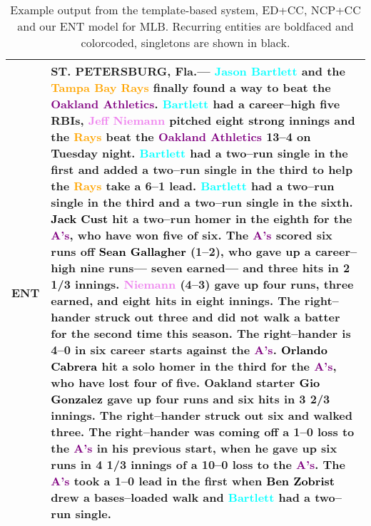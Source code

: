 \documentclass[11pt,a4paper]{article}
\begin{document}
\begin{table*}
\begin{tabular}{|c|p{13.5cm}|}
\\ 
\hline 
ENT & 
ST. PETERSBURG, Fla.--- \textcolor{cyan}{\textbf{Jason Bartlett}} and the \textcolor{orange}{\textbf{Tampa Bay Rays}} finally found a way to beat the \textcolor{purple}{\textbf{Oakland Athletics}}. \textcolor{cyan}{\textbf{Bartlett}} had a career--high five RBIs, \textcolor{violet}{\textbf{Jeff Niemann}} pitched eight strong innings and the \textcolor{orange}{\textbf{Rays}} beat the \textcolor{purple}{\textbf{Oakland Athletics}} 13--4 on Tuesday night. \textcolor{cyan}{\textbf{Bartlett}} had a two--run single in the first and added a two--run single in the third to help the \textcolor{orange}{\textbf{Rays}} take a 6--1 lead. \textcolor{cyan}{\textbf{Bartlett}} had a two--run single in the third and a two--run single in the sixth. \textcolor{black}{\textbf{Jack Cust}} hit a two--run homer in the eighth for the \textcolor{purple}{\textbf{A's}}, who have won five of six. The \textcolor{purple}{\textbf{A's}} scored six runs off \textcolor{black}{\textbf{Sean Gallagher}} (1--2), who gave up a career--high nine runs--- seven earned--- and three hits in 2 1/3 innings. \textcolor{violet}{\textbf{Niemann}} (4--3) gave up four runs, three earned, and eight hits in eight innings. The right--hander struck out three and did not walk a batter for the second time this season. The right--hander is 4--0 in six career starts against the \textcolor{purple}{\textbf{A's}}. \textcolor{black}{\textbf{Orlando Cabrera}} hit a solo homer in the third for the \textcolor{purple}{\textbf{A's}}, who have lost four of five. Oakland starter \textcolor{black}{\textbf{Gio Gonzalez}} gave up four runs and six hits in 3 2/3 innings. The right--hander struck out six and walked three. The right--hander was coming off a 1--0 loss to the \textcolor{purple}{\textbf{A's}} in his previous start, when he gave up six runs in 4 1/3 innings of a 10--0 loss to the \textcolor{purple}{\textbf{A's}}. The \textcolor{purple}{\textbf{A's}} took a 1--0 lead in the first when \textcolor{black}{\textbf{Ben Zobrist}} drew a bases--loaded walk and \textcolor{cyan}{\textbf{Bartlett}} had a two--run single.
\\ 
\hline 
\end{tabular} 
\caption{Example output from the template-based system, ED+CC, 
  NCP+CC \cite{DBLP:journals/corr/abs-1809-00582} and our ENT model for \textsc{MLB}. 
  Recurring entities  are boldfaced and colorcoded,
  singletons are shown in black.}
\label{tbl:examples2}
\end{table*}
\end{document}
